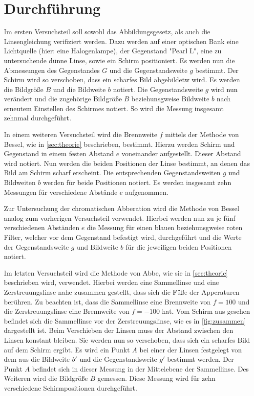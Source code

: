\section{Durchführung}
\label{sec:Durchführung}
Im ersten Versuchsteil soll sowohl das Abbildungsgesetz, als auch die Linsengleichung verifiziert werden. Dazu werden auf einer optischen 
Bank eine Lichtquelle (hier: eine Halogenlampe), der Gegenstand "Pearl L", eine zu untersuchende dünne Linse, sowie ein Schirm positioniert.
Es werden nun die Abmessungen des Gegenstandes $G$ und die Gegenstandsweite $g$ bestimmt. Der Schirm wird so verschoben, dass ein scharfes 
Bild abgebildetw wird. Es werden die Bildgröße $B$ und die Bildweite $b$ notiert. Die Gegenstandsweite $g$ wird nun verändert und die zugehörige
Bildgröße $B$ beziehunsgweise Bildweite $b$ nach erneutem Einstellen des Schirmes notiert. So wird die Messung insgesamt zehnmal durchgeführt.

In einem weiteren Versuchsteil wird die Brennweite $f$ mittels der Methode von Bessel, wie in \autoref{sec:theorie} beschrieben, bestimmt.
Hierzu werden Schirm und Gegenstand in einem festen Abstand $e$ voneinander aufgestellt. Dieser Abstand wird notiert. Nun werden die beiden
Positionen der Linse bestimmt, an denen das Bild am Schirm scharf erscheint. Die entsprechenden Gegenstandsweiten $g$ und Bildweiten $b$
werden für beide Positionen notiert. Es werden insgesamt zehn Messungen für verschiedene Abstände $e$ aufgenommen.  

Zur Untersuchung der chromatischen Abberation wird die Methode von Bessel analog zum vorherigen Versuchsteil verwendet. Hierbei werden nun 
zu je fünf verschiedenen Abständen $e$ die Messung für einen blauen beziehunsgweise roten Filter, welcher vor dem Gegenstand befestigt wird,
durchgeführt und die Werte der Gegenstandsweite $g$ und Bildweite $b$ für die jeweiligen beiden Positionen notiert.

Im letzten Versuchsteil wird die Methode von Abbe, wie sie in \autoref{sec:theorie} beschrieben wird, verwendet. Hierbei werden eine Sammellinse
und eine Zerstreuungslinse nahe zusammen gestellt, dass sich die Füße der Apperaturen berühren. Zu beachten ist, dass die Sammellinse
eine Brennweite von $f = 100$ und die Zerstreuungslinse eine Brennweite von $f = -100$ hat. Vom Schirm aus gesehen befindet sich die
Sammellinse vor der Zerstreuungslinse, wie es in \autoref{fig:zusammen} dargestellt ist. Beim Verschieben der Linsen muss der Abstand
zwischen den Linsen konstant bleiben. Sie werden nun so verschoben, dass sich ein scharfes Bild auf dem Schirm ergibt. Es wird ein Punkt $A$
bei einer der Linsen festgelegt von dem aus die Bildweite $b'$ und die Gegenstandsweite $g'$ bestimmt werden. Der Punkt $A$ befindet sich
in dieser Messung in der Mittelebene der Sammellinse. Des Weiteren wird die Bildgröße $B$ gemessen. Diese Messung wird für zehn verschiedene
Schirmpositionen durchgeführt.